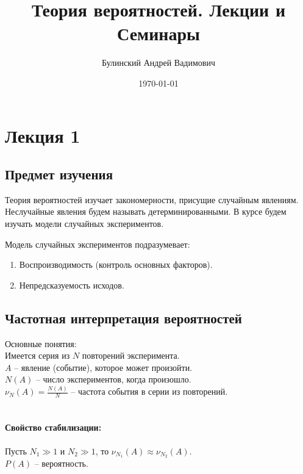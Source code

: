 \documentclass[a4paper, 12pt]{article}
\author{Булинский Андрей Вадимович}
\title{Теория вероятностей. Лекции и Семинары}
\date{\today}
\begin{document}
	\maketitle
	\newpage
	\tableofcontents
	\newpage
	\section{Лекция 1}
	\subsection{Предмет изучения}
	Теория вероятностей изучает закономерности, присущие случайным явлениям. Неслучайные явления будем называть детерминированными. В курсе будем изучать модели случайных экспериментов.\par
	Модель случайных экспериментов подразумевает:
	\begin{enumerate}
		\item Воспроизводимость (контроль основных факторов).
		\item Непредсказуемость исходов.
	\end{enumerate}
	\subsection{Частотная интерпретация вероятностей}
	Основные понятия:\\
	Имеется серия из $N$ повторений эксперимента.\\
	$A$ – явление (событие), которое может произойти.\\
	$N(A)$ – число экспериментов, когда  произошло.\\
	$\nu_N\left(A\right)=\frac{N\left(A\right)}{N}$ – частота события  в серии из  повторений.\\
	\\
	\paragraph{Свойство стабилизации:}
	Пусть $N_1\gg 1$ и $N_2\gg 1$, то $\nu_{N_1}\left(A\right)\approx\nu_{N_2}\left(A\right)$.\\
	$P\left(A\right)$ – вероятность.
\end{document}
